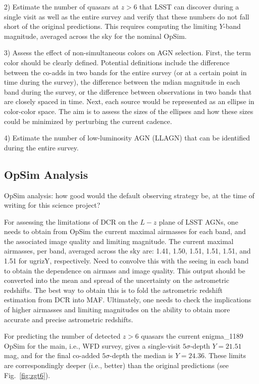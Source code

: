 2) Estimate the number of quasars at $z>6$ that LSST can discover
during a single visit as well as the entire survey and verify that
these numbers do not fall short of the original predictions. This
requires computing the limiting $Y$-band magnitude, averaged
across the sky for the nominal OpSim.

3) Assess the effect of non-simultaneous colors on AGN selection.
First, the term color should be clearly defined. Potential definitions
include the difference between the co-adds in two bands for the entire
survey (or at a certain point in time during the survey), the difference
between the mdian magnitude in each band during the survey, or the
difference between observations in two bands that are closely spaced in time.
Next, each source would be represented as an ellipse in color-color space.
The aim is to assess the sizes of the ellipses and how these sizes could be
minimized by perturbing the current cadence.

4) Estimate the number of low-luminosity AGN (LLAGN) that can be
identified during the entire survey.


\subsection{OpSim Analysis}
\label{sec:\secname:analysis}

OpSim analysis: how good would the default observing strategy be, at
the time of writing for this science project?

For assessing the limitations of DCR on the $L-z$ plane of LSST AGNs,
one needs to obtain from OpSim the current maximal airmasses for each band,
and the associated image quality and limiting magnitude. The current maximal
airmasses, per band, averaged across the sky are: 1.41, 1.50, 1.51, 1.51, 1.51,
and 1.51 for ugrizY, respectively. Need to convolve this with the
seeing in each band to obtain the dependence on airmass and image
quality. This output should be converted into the mean and spread
of the uncertainty on the astrometric redshifts. The best way
to obtain this is to fold the astrometric redshift estimation from
DCR into MAF. Ultimately, one needs to check the implications of higher
airmasses and limiting magnitudes on the ability to obtain more accurate
and precise astrometric redshifts.

For predicting the number of detected $z>6$ quasars
the current enigma\_1189 OpSim for the main, i.e., WFD survey, gives a
single-visit $5\sigma$-depth
$Y=21.51$ mag, and for the final co-added $5\sigma$-depth the median is $Y=24.36$.
These limits are correspondingly deeper (i.e., better) than the original predictions
(see Fig.~\ref{fig:zgt6}).

